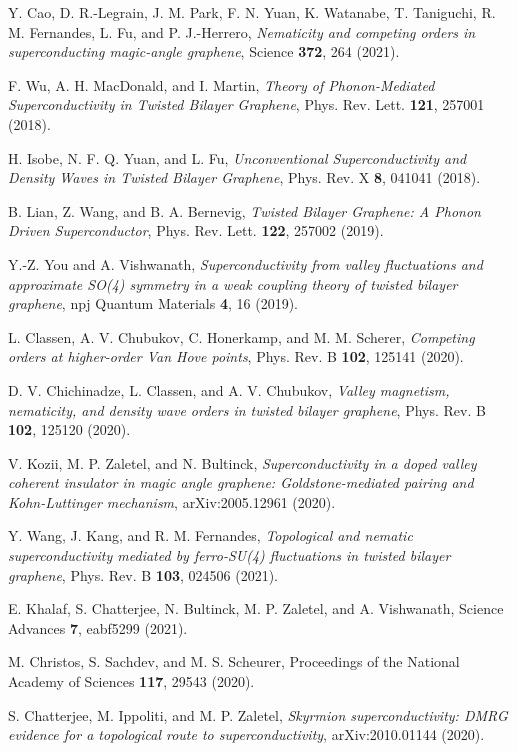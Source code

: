 \documentclass[aps,prb,amsmath,amssymb,floatfix,twocolumn]{revtex4}
\begin{document}
\begin{thebibliography}{}
 Y. Cao, D. R.-Legrain, J. M. Park, F. N. Yuan, K. Watanabe, T. Taniguchi, R. M. Fernandes, L. Fu, and P. J.-Herrero, \emph{Nematicity and competing orders in superconducting magic-angle graphene}, Science \textbf{372}, 264 (2021).

 F. Wu, A. H. MacDonald, and I. Martin, \emph{Theory of Phonon-Mediated Superconductivity in Twisted Bilayer Graphene}, Phys. Rev. Lett. \textbf{121}, 257001 (2018).

 H. Isobe, N. F. Q. Yuan, and L. Fu, \emph{Unconventional Superconductivity and Density Waves in Twisted Bilayer Graphene}, Phys. Rev. X \textbf{8}, 041041 (2018).

 B. Lian, Z. Wang, and B. A. Bernevig, \emph{Twisted Bilayer Graphene: A Phonon Driven Superconductor}, Phys. Rev. Lett. \textbf{122}, 257002 (2019).

 Y.-Z. You and A. Vishwanath, \emph{Superconductivity from valley fluctuations and approximate SO(4) symmetry in a weak coupling theory of twisted bilayer
graphene}, npj Quantum Materials \textbf{4}, 16 (2019).

 L. Classen, A. V. Chubukov, C. Honerkamp, and M. M. Scherer, \emph{Competing orders at higher-order Van Hove points}, Phys. Rev. B \textbf{102}, 125141 (2020).

 D. V. Chichinadze, L. Classen, and A. V. Chubukov, \emph{Valley magnetism, nematicity, and density wave orders in twisted bilayer graphene}, Phys. Rev. B \textbf{102}, 125120 (2020).

 V. Kozii, M. P. Zaletel, and N. Bultinck, \emph{Superconductivity in a doped valley coherent insulator in magic angle graphene: Goldstone-mediated pairing and Kohn-Luttinger mechanism}, arXiv:2005.12961 (2020).

 Y. Wang, J. Kang, and R. M. Fernandes, \emph{Topological and nematic superconductivity mediated by ferro-SU(4) fluctuations in twisted bilayer graphene}, Phys. Rev. B \textbf{103}, 024506 (2021).

 E. Khalaf, S. Chatterjee, N. Bultinck, M. P. Zaletel, and A. Vishwanath, Science Advances \textbf{7}, eabf5299 (2021).

 M. Christos, S. Sachdev, and M. S. Scheurer, Proceedings of the National Academy of Sciences \textbf{117}, 29543 (2020).

 S. Chatterjee, M. Ippoliti, and M. P. Zaletel, {\it Skyrmion superconductivity: DMRG evidence for a topological route to superconductivity}, arXiv:2010.01144 (2020).


\end{thebibliography}
\end{document}
